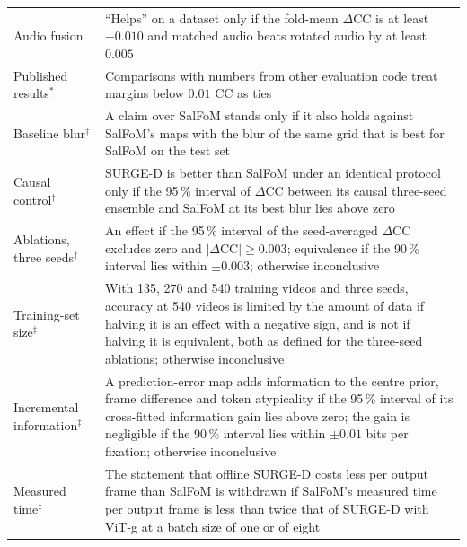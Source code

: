 \begin{table}[htbp]
\begin{tabularx}{\textwidth}{@{}>{\raggedright}p{3.3cm}>{\raggedright\arraybackslash}X@{}}
    Audio fusion & \enquote{Helps} on a dataset only if the fold-mean
      $\Delta$\acrshort{CC} is at least $+0.010$ and matched audio beats rotated audio by
      at least $0.005$ \\
    Published results$^{\ast}$ & Comparisons with numbers from other evaluation code
      treat margins below $0.01$ \acrshort{CC} as ties \\
    Baseline blur$^{\dagger}$ & A claim over SalFoM stands only if it also holds
      against SalFoM's maps with the blur of the same grid that is best for SalFoM
      on the test set \\
    Causal control$^{\dagger}$ & SURGE-D is better than SalFoM under an identical
      protocol only if the 95\,\% interval of $\Delta$\acrshort{CC} between its causal
      three-seed ensemble and SalFoM at its best blur lies above zero \\
    Ablations, three seeds$^{\dagger}$ & An effect if the 95\,\% interval of the
      seed-averaged $\Delta$\acrshort{CC} excludes zero and $|\Delta\mathrm{CC}|\geq0.003$;
      equivalence if the 90\,\% interval lies within $\pm0.003$; otherwise
      inconclusive \\
    Training-set size$^{\ddagger}$ & With 135, 270 and 540 training videos and
      three seeds, accuracy at 540 videos is limited by the amount of data if
      halving it is an effect with a negative sign, and is not if halving it is
      equivalent, both as defined for the three-seed ablations; otherwise
      inconclusive \\
    Incremental information$^{\ddagger}$ & A prediction-error map adds
      information to the centre prior, frame difference and token atypicality if
      the 95\,\% interval of its cross-fitted information gain lies above zero;
      the gain is negligible if the 90\,\% interval lies within $\pm0.01$ bits
      per fixation; otherwise inconclusive \\
    Measured time$^{\ddagger}$ & The statement that offline SURGE-D costs less
      per output frame than SalFoM is withdrawn if SalFoM's measured time per
      output frame is less than twice that of SURGE-D with \acrshort{ViT}-g at a
      batch size of one or of eight \\
    \bottomrule
  \end{tabularx}
\end{table}

